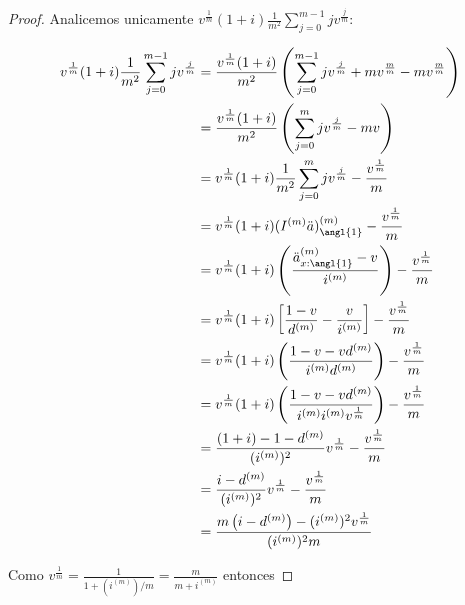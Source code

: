 \begin{proof}
    Analicemos unicamente $v^{\frac{1}{m}} (1 + i) \frac{1}{m^2} \sum_{j=0}^{m-1} j v^{\frac{j}{m}}$:
    
    \begin{align*}
        v^{\frac{1}{m}} (1 + i) \frac{1}{m^2} \sum_{j=0}^{m-1} j v^{\frac{j}{m}} &=\frac{v^{\frac{1}{m}} (1 + i)}{m^2} \left( \sum_{j=0}^{m-1} j v^{\frac{j}{m}} + m v^{\frac{m}{m}} - m v^{\frac{m}{m}} \right)\\
        &= \frac{v^{\frac{1}{m}} (1 + i)}{m^2} \left( \sum_{j=0}^{m} j v^{\frac{j}{m}} - m v \right)\\
        &= v^{\frac{1}{m}} (1 + i) \frac{1}{m^2} \sum_{j=0}^{m} j v^{\frac{j}{m}} - \frac{v^{\frac{1}{m}}}{m}\\
        &= v^{\frac{1}{m}} (1 + i) (I^{(m)}\ddot{a})^{(m)}_\angl{1} - \frac{v^{\frac{1}{m}}}{m}\\
        &= v^{\frac{1}{m}} (1 + i) \left( \frac{\ddot{a}^{(m)}_{x:\angl{1}} - v}{i^{(m)}} \right) - \frac{v^{\frac{1}{m}}}{m}\\
        &= v^{\frac{1}{m}} (1 + i) \left[ \frac{1-v}{d^{(m)}} - \frac{v}{i^{(m)}} \right] - \frac{v^{\frac{1}{m}}}{m}\\
        &= v^{\frac{1}{m}} (1 + i) \left( \frac{1 - v - v d^{(m)}}{i^{(m)}d^{(m)}} \right) - \frac{v^{\frac{1}{m}}}{m}\\
        &= v^{\frac{1}{m}} (1 + i) \left( \frac{1 - v - v d^{(m)}}{i^{(m)}i^{(m)}v^{\frac{1}{m}}} \right) - \frac{v^{\frac{1}{m}}}{m}\\
        &= \frac{(1+i) - 1 - d^{(m)}}{(i^{(m)})^2} v^{\frac{1}{m}} - \frac{v^{\frac{1}{m}}}{m}\\
        &= \frac{i - d^{(m)}}{(i^{(m)})^2} v^{\frac{1}{m}} - \frac{v^{\frac{1}{m}}}{m}\\
        &= \frac{m \left( i - d^{(m)} \right) - (i^{(m)})^2 v^{\frac{1}{m}}}{(i^{(m)})^2 m}
    \end{align*}

    Como $v^{\frac{1}{m}} = \frac{1}{1+(i^{(m)})/m} = \frac{m}{m+i^{(m)}}$ entonces


\end{proof}
